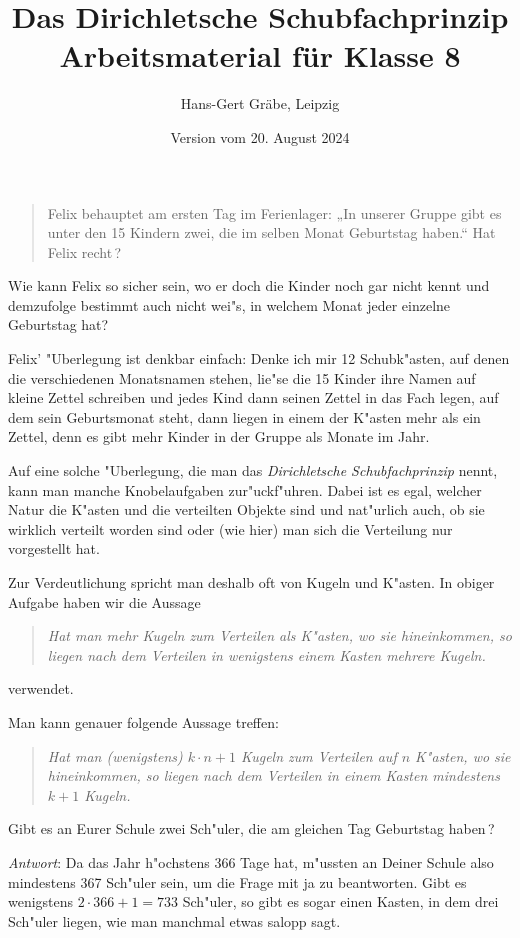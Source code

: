 \documentclass[11pt]{article}
\author{Hans-Gert Gräbe, Leipzig}
\title{Das Dirichletsche Schubfachprinzip\kosemnetlicensemark\\ 
Arbeitsmaterial für Klasse 8}
\date{Version vom 20. August 2024}
\begin{document}
 
\maketitle 

\begin{quote}
Felix behauptet am ersten Tag im Ferienlager: „In unserer Gruppe gibt es unter
den 15 Kindern zwei, die im selben Monat Geburtstag haben.“ Hat Felix recht\,?
\end{quote}
Wie kann Felix so sicher sein, wo er doch die Kinder noch gar nicht kennt und
demzufolge bestimmt auch nicht wei"s, in welchem Monat jeder einzelne
Geburtstag hat?

Felix' "Uberlegung ist denkbar einfach: Denke ich mir 12 Schubk"asten, auf
denen die verschiedenen Monatsnamen stehen, lie"se die 15 Kinder ihre Namen
auf kleine Zettel schreiben und jedes Kind dann seinen Zettel in das Fach
legen, auf dem sein Geburtsmonat steht, dann liegen in einem der K"asten mehr
als ein Zettel, denn es gibt mehr Kinder in der Gruppe als Monate im Jahr.

Auf eine solche "Uberlegung, die man das \emph{Dirichletsche Schubfachprinzip}
nennt, kann man manche Knobelaufgaben zur"uckf"uhren. Dabei ist es egal,
welcher Natur die K"asten und die verteilten Objekte sind und nat"urlich auch,
ob sie wirklich verteilt worden sind oder (wie hier) man sich die Verteilung
nur vorgestellt hat.

Zur Verdeutlichung spricht man deshalb oft von Kugeln und K"asten. In obiger
Aufgabe haben wir die Aussage
\begin{quote}\it
Hat man mehr Kugeln zum Verteilen als K"asten, wo sie hineinkommen, so liegen
nach dem Verteilen in wenigstens einem Kasten mehrere Kugeln.
\end{quote}
verwendet.

Man kann genauer folgende Aussage treffen:
\begin{quote} \it
Hat man (wenigstens) $k\cdot n+1$ Kugeln zum Verteilen auf $n$ K"asten, wo sie
hineinkommen, so liegen nach dem Verteilen in einem Kasten mindestens $k+1$
Kugeln.
\end{quote}

\begin{aufgabe}
  Gibt es an Eurer Schule zwei Sch"uler, die am gleichen Tag Geburtstag
  haben\,?
\end{aufgabe}

\emph{Antwort}: Da das Jahr h"ochstens 366 Tage hat, m"ussten an Deiner Schule
also mindestens 367 Sch"uler sein, um die Frage mit {\glqq}ja{\grqq} zu
beantworten. Gibt es wenigstens $2\cdot 366+1=733$ Sch"uler, so gibt es sogar
einen {\glqq}Kasten, in dem drei Sch"uler liegen{\grqq}, wie man manchmal
etwas salopp sagt.
\end{document}
